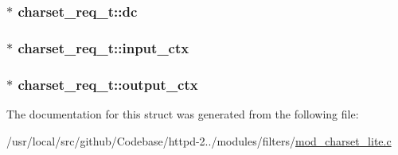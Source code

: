\subsubsection[{\texorpdfstring{dc}{dc}}]{$\ast$ charset\+\_\+req\+\_\+t\+::dc}\hypertarget{structcharset__req__t_a085a10e3c9d9a24e2f4e5600d1e322f2}{}\label{structcharset__req__t_a085a10e3c9d9a24e2f4e5600d1e322f2}
\subsubsection[{\texorpdfstring{input\+\_\+ctx}{input_ctx}}]{ $\ast$ charset\+\_\+req\+\_\+t\+::input\+\_\+ctx}\hypertarget{structcharset__req__t_abd19442cbfb9cca08c343bc31296c111}{}\label{structcharset__req__t_abd19442cbfb9cca08c343bc31296c111}
\subsubsection[{\texorpdfstring{output\+\_\+ctx}{output_ctx}}]{$\ast$ charset\+\_\+req\+\_\+t\+::output\+\_\+ctx}\hypertarget{structcharset__req__t_ac23d1bbf83d1cce9ec00a85eb8ceac36}{}\label{structcharset__req__t_ac23d1bbf83d1cce9ec00a85eb8ceac36}


The documentation for this struct was generated from the following file\+:\begin{DoxyCompactItemize}
\item 
/usr/local/src/github/\+Codebase/httpd-\/2../modules/filters/\hyperlink{mod__charset__lite_8c}{mod\+\_\+charset\+\_\+lite.\+c}\end{DoxyCompactItemize}
